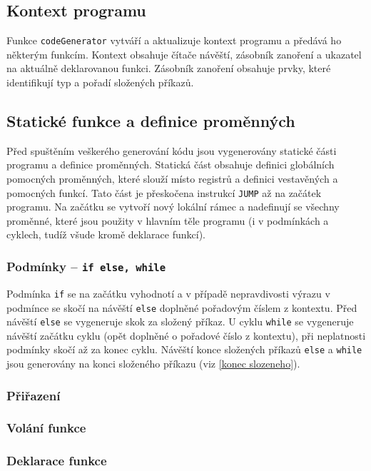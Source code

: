 \documentclass[a4paper, 12pt]{article}
\begin{document}
    \subsection{Kontext programu}
    Funkce \texttt{codeGenerator} vytváří a aktualizuje kontext programu a předává ho některým funkcím. Kontext obsahuje čítače návěští, zásobník zanoření a ukazatel na aktuálně deklarovanou funkci. Zásobník zanoření obsahuje prvky, které identifikují typ a pořadí složených příkazů.

    \subsection{Statické funkce a definice proměnných}
    Před spuštěním veškerého generování kódu jsou vygenerovány statické části programu a definice proměnných. Statická část obsahuje definici globálních pomocných proměnných, které slouží místo registrů a definici vestavěných a pomocných funkcí. Tato část je přeskočena instrukcí \texttt{JUMP} až na začátek programu. Na začátku se vytvoří nový lokální rámec a nadefinují se všechny proměnné, které jsou použity v hlavním těle programu (i v podmínkách a cyklech, tudíž všude kromě deklarace funkcí).

    \subsubsection{Podmínky -- \texttt{if else, while}}
    Podmínka \texttt{if} se na začátku vyhodnotí a v případě nepravdivosti výrazu v podmínce se skočí na návěští \texttt{else} doplněné pořadovým číslem z kontextu. Před návěští \texttt{else} se vygeneruje skok za složený příkaz. U cyklu \texttt{while} se vygeneruje návěští začátku cyklu (opět doplněné o pořadové číslo z kontextu), při neplatnosti podmínky skočí až za konec cyklu. Návěští konce složených příkazů \texttt{else} a \texttt{while} jsou generovány na konci složeného příkazu (viz \ref{konec slozeneho}).

    \subsubsection{Přiřazení}
    \subsubsection{Volání funkce}
    \subsubsection{Deklarace funkce}
\end{document}

